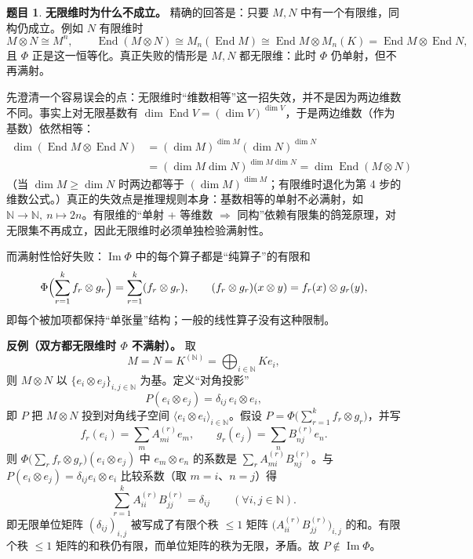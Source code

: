 \documentclass[a4paper]{ctexart}
\theoremstyle{definition}
\newtheorem{example}{题目}[section]
\theoremstyle{analysis}
\theoremstyle{plain}
\begin{document}
\begin{example}
\textbf{无限维时为什么不成立。}
精确的回答是：只要 \(M,N\) 中有一个有限维，同构仍成立。例如 \(N\) 有限维时
\[
  M\otimes N\cong M^n,\qquad
  \operatorname{End}(M\otimes N)\cong M_n(\operatorname{End}M)
  \cong \operatorname{End}M\otimes M_n(K)
  =\operatorname{End}M\otimes\operatorname{End}N,
\]
且 \(\Phi\) 正是这一恒等化。真正失败的情形是 \(M,N\) 都无限维：此时 \(\Phi\) 仍单射，但不再满射。

先澄清一个容易误会的点：无限维时``维数相等''这一招失效，并不是因为两边维数不同。事实上对无限基数有 \(\dim\operatorname{End}V=(\dim V)^{\dim V}\)，于是两边维数（作为基数）依然相等：
\[
\begin{aligned}
  \dim(\operatorname{End}M\otimes\operatorname{End}N)
  &=(\dim M)^{\dim M}(\dim N)^{\dim N}\\
  &=(\dim M\dim N)^{\dim M\dim N}
  =\dim\operatorname{End}(M\otimes N)
\end{aligned}
\]
（当 \(\dim M\ge\dim N\) 时两边都等于 \((\dim M)^{\dim M}\)；有限维时退化为第 4 步的维数公式。）真正的失效点是推理规则本身：基数相等的单射不必满射，如 \(\mathbb N\to\mathbb N,\ n\mapsto 2n\)。有限维的``单射 + 等维数 \(\Rightarrow\) 同构''依赖有限集的鸽笼原理，对无限集不再成立，因此无限维时必须单独检验满射性。

而满射性恰好失败：\(\operatorname{Im}\Phi\) 中的每个算子都是``纯算子''的有限和
\[
  \Phi\Bigl(\sum_{r=1}^k f_r\otimes g_r\Bigr)
  =
  \sum_{r=1}^k (f_r\otimes g_r),
  \qquad
  (f_r\otimes g_r)(x\otimes y)=f_r(x)\otimes g_r(y),
\]
即每个被加项都保持``单张量''结构；一般的线性算子没有这种限制。

\textbf{反例（双方都无限维时 \(\Phi\) 不满射）。}
取
\[
  M=N=K^{(\mathbb N)}=\bigoplus_{i\in\mathbb N}Ke_i,
\]
则 \(M\otimes N\) 以 \(\{e_i\otimes e_j\}_{i,j\in\mathbb N}\) 为基。定义``对角投影''
\[
  P(e_i\otimes e_j)=\delta_{ij}\,e_i\otimes e_i,
\]
即 \(P\) 把 \(M\otimes N\) 投到对角线子空间 \(\langle e_i\otimes e_i\rangle_{i\in\mathbb N}\)。假设
\(P=\Phi\bigl(\sum_{r=1}^k f_r\otimes g_r\bigr)\)，并写
\[
  f_r(e_i)=\sum_m A^{(r)}_{mi}e_m,\qquad
  g_r(e_j)=\sum_n B^{(r)}_{nj}e_n.
\]
则 \(\Phi\bigl(\sum_r f_r\otimes g_r\bigr)(e_i\otimes e_j)\) 中 \(e_m\otimes e_n\) 的系数是
\(\sum_r A^{(r)}_{mi}B^{(r)}_{nj}\)。与 \(P(e_i\otimes e_j)=\delta_{ij}e_i\otimes e_i\)
比较系数（取 \(m=i\)、\(n=j\)）得
\[
  \sum_{r=1}^k A^{(r)}_{ii}B^{(r)}_{jj}=\delta_{ij}
  \qquad (\forall i,j\in\mathbb N).
\]
即无限单位矩阵 \((\delta_{ij})_{i,j}\) 被写成了有限个秩 \(\le 1\) 矩阵
\(\bigl(A^{(r)}_{ii}B^{(r)}_{jj}\bigr)_{i,j}\) 的和。有限个秩 \(\le 1\) 矩阵的和秩仍有限，而单位矩阵的秩为无限，矛盾。故 \(P\notin\operatorname{Im}\Phi\)。


\end{example}
\end{document}
